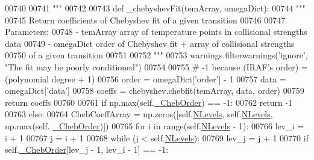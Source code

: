 \begin{DoxyCode}
{{00740 \textcolor{stringliteral}{}
00741 \textcolor{stringliteral}{        """}
00742 
00743         \textcolor{keyword}{def }\_chebyshevFit(temArray, omegaDict):
00744             \textcolor{stringliteral}{"""}
00745 \textcolor{stringliteral}{            Return coefficients of Chebyshev fit of a given transition}
00746 \textcolor{stringliteral}{            }
00747 \textcolor{stringliteral}{            Parameters:}
00748 \textcolor{stringliteral}{                - temArray    array of temperature points in collisional strengths data}
00749 \textcolor{stringliteral}{                - omegaDict   order of Chebyshev fit + array of collisional strengths }
00750 \textcolor{stringliteral}{                                of a given transition}
00751 \textcolor{stringliteral}{}
00752 \textcolor{stringliteral}{            """}
00753             warnings.filterwarnings(\textcolor{stringliteral}{'ignore'}, \textcolor{stringliteral}{"The fit may be poorly conditioned"})
00754 
00755             \textcolor{comment}{# -1 because (IRAF's order) = (polynomial degree + 1)}
00756             order = omegaDict[\textcolor{stringliteral}{'order'}] - 1
00757             data = omegaDict[\textcolor{stringliteral}{'data'}]
00758             coeffs = chebyshev.chebfit(temArray, data, order)
00759             \textcolor{keywordflow}{return} coeffs
00760         
00761         \textcolor{keywordflow}{if} np.max(self.\hyperlink{classpyneb_1_1core_1_1pynebcore_1_1___coll_data_fits_aeb6a6f312ca21c1e1b3aa72225a0d442}{\_ChebOrder}) == -1:
00762             \textcolor{keywordflow}{return} -1
00763         \textcolor{keywordflow}{else}:
00764             ChebCoeffArray = np.zeros([self.\hyperlink{classpyneb_1_1core_1_1pynebcore_1_1___coll_data_fits_a64b97a86b4dfb53e4cba3ce8ac0fdf00}{NLevels}, self.\hyperlink{classpyneb_1_1core_1_1pynebcore_1_1___coll_data_fits_a64b97a86b4dfb53e4cba3ce8ac0fdf00}{NLevels}, np.max(self.
      \hyperlink{classpyneb_1_1core_1_1pynebcore_1_1___coll_data_fits_aeb6a6f312ca21c1e1b3aa72225a0d442}{\_ChebOrder})])
00765             \textcolor{keywordflow}{for} i \textcolor{keywordflow}{in} range(self.\hyperlink{classpyneb_1_1core_1_1pynebcore_1_1___coll_data_fits_a64b97a86b4dfb53e4cba3ce8ac0fdf00}{NLevels} - 1):
00766                 lev\_i = i + 1
00767                 j = i + 1
00768                 \textcolor{keywordflow}{while} (j < self.\hyperlink{classpyneb_1_1core_1_1pynebcore_1_1___coll_data_fits_a64b97a86b4dfb53e4cba3ce8ac0fdf00}{NLevels}):
00769                     lev\_j = j + 1
00770                     \textcolor{keywordflow}{if} self.\hyperlink{classpyneb_1_1core_1_1pynebcore_1_1___coll_data_fits_aeb6a6f312ca21c1e1b3aa72225a0d442}{\_ChebOrder}[lev\_j - 1, lev\_i - 1] == -1:
}}
\end{DoxyCode}
